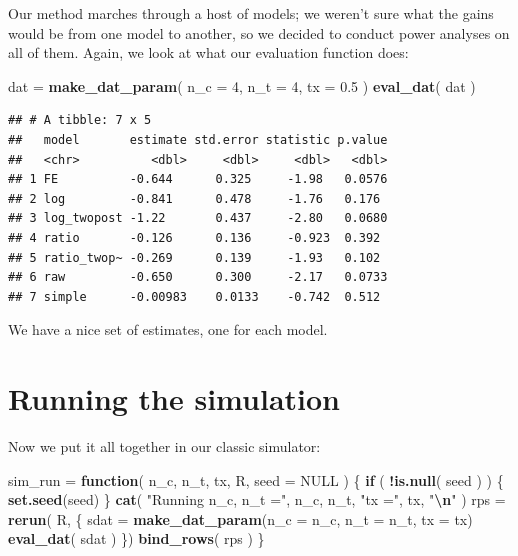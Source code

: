 \documentclass[
]{book}
\newenvironment{Shaded}{\begin{snugshade}}{\end{snugshade}}
\newcommand{\AttributeTok}[1]{\textcolor[rgb]{0.13,0.29,0.53}{#1}}
\newcommand{\ConstantTok}[1]{\textcolor[rgb]{0.56,0.35,0.01}{#1}}
\newcommand{\ControlFlowTok}[1]{\textcolor[rgb]{0.13,0.29,0.53}{\textbf{#1}}}
\newcommand{\DecValTok}[1]{\textcolor[rgb]{0.00,0.00,0.81}{#1}}
\newcommand{\FloatTok}[1]{\textcolor[rgb]{0.00,0.00,0.81}{#1}}
\newcommand{\FunctionTok}[1]{\textcolor[rgb]{0.13,0.29,0.53}{\textbf{#1}}}
\newcommand{\NormalTok}[1]{#1}
\newcommand{\OtherTok}[1]{\textcolor[rgb]{0.56,0.35,0.01}{#1}}
\newcommand{\SpecialCharTok}[1]{\textcolor[rgb]{0.81,0.36,0.00}{\textbf{#1}}}
\newcommand{\StringTok}[1]{\textcolor[rgb]{0.31,0.60,0.02}{#1}}
\begin{document}
Our method marches through a host of models; we weren't sure what the gains would be from one model to another, so we decided to conduct power analyses on all of them.
Again, we look at what our evaluation function does:

\begin{Shaded}
\begin{Highlighting}[]
\NormalTok{dat }\OtherTok{=} \FunctionTok{make\_dat\_param}\NormalTok{( }\AttributeTok{n\_c =} \DecValTok{4}\NormalTok{, }\AttributeTok{n\_t =} \DecValTok{4}\NormalTok{, }\AttributeTok{tx =} \FloatTok{0.5}\NormalTok{ )}
\FunctionTok{eval\_dat}\NormalTok{( dat )}
\end{Highlighting}
\end{Shaded}

\begin{verbatim}
## # A tibble: 7 x 5
##   model       estimate std.error statistic p.value
##   <chr>          <dbl>     <dbl>     <dbl>   <dbl>
## 1 FE          -0.644      0.325     -1.98   0.0576
## 2 log         -0.841      0.478     -1.76   0.176 
## 3 log_twopost -1.22       0.437     -2.80   0.0680
## 4 ratio       -0.126      0.136     -0.923  0.392 
## 5 ratio_twop~ -0.269      0.139     -1.93   0.102 
## 6 raw         -0.650      0.300     -2.17   0.0733
## 7 simple      -0.00983    0.0133    -0.742  0.512
\end{verbatim}

We have a nice set of estimates, one for each model.

\section{Running the simulation}\label{running-the-simulation-1}

Now we put it all together in our classic simulator:

\begin{Shaded}
\begin{Highlighting}[]
\NormalTok{sim\_run }\OtherTok{=} \ControlFlowTok{function}\NormalTok{( n\_c, n\_t, tx, R, }\AttributeTok{seed =} \ConstantTok{NULL}\NormalTok{ ) \{}
    \ControlFlowTok{if}\NormalTok{ ( }\SpecialCharTok{!}\FunctionTok{is.null}\NormalTok{( seed ) ) \{}
        \FunctionTok{set.seed}\NormalTok{(seed)}
\NormalTok{    \}}
    \FunctionTok{cat}\NormalTok{( }\StringTok{"Running n\_c, n\_t ="}\NormalTok{, n\_c, n\_t, }\StringTok{"tx ="}\NormalTok{, tx, }\StringTok{"}\SpecialCharTok{\textbackslash{}n}\StringTok{"}\NormalTok{ )}
\NormalTok{    rps }\OtherTok{=} \FunctionTok{rerun}\NormalTok{( R, \{}
\NormalTok{        sdat }\OtherTok{=} \FunctionTok{make\_dat\_param}\NormalTok{(}\AttributeTok{n\_c =}\NormalTok{ n\_c, }\AttributeTok{n\_t =}\NormalTok{ n\_t, }\AttributeTok{tx =}\NormalTok{ tx)}
        \FunctionTok{eval\_dat}\NormalTok{( sdat )}
\NormalTok{    \})}
    \FunctionTok{bind\_rows}\NormalTok{( rps )}
\NormalTok{\}}
\end{Highlighting}
\end{Shaded}
\end{document}
